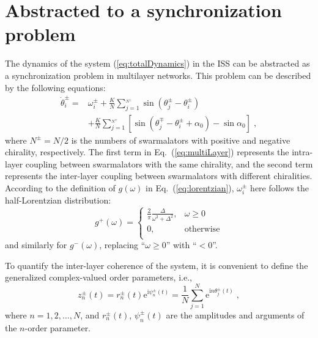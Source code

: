 \documentclass{article}
\begin{document}
\newpage
\section{Abstracted to a synchronization problem}

The dynamics of the system (\ref{eq:totalDynamics}) in the ISS can be abstracted as a synchronization problem in multilayer networks. This problem can be described by the following equations:
\begin{equation}
    \label{eq:multiLayer}
    \begin{aligned}
        \dot{\theta}_{i}^{\pm}=&\omega _{i}^{\pm}+\frac{K}{N}\sum_{j=1}^{_{N^{\pm}}}{\sin \left( \theta _{j}^{\pm}-\theta _{i}^{\pm} \right)}\\
        &+\frac{K}{N}\sum_{j=1}^{_{N^{\mp}}}{\left[ \sin \left( \theta _{j}^{\mp}-\theta _{i}^{\pm}+\alpha _0 \right) -\sin \alpha _0 \right]}\;,
    \end{aligned}
\end{equation}
where $N^{\pm}=N/2$ is the numbers of swarmalators with positive and negative chirality, respectively. The first term in Eq.~(\ref{eq:multiLayer}) represents the intra-layer coupling between swarmalators with the same chirality, and the second term represents the inter-layer coupling between swarmalators with different chiralities. According to the definition of $g\left(\omega\right)$ in Eq.~(\ref{eq:lorentzian}), $\omega^{\pm}_i$ here follows the half-Lorentzian distribution:
\begin{equation}
    g^{+}\left( \omega \right) =\begin{cases}
        \frac{2}{\pi}\frac{\Delta}{\omega ^2+\Delta ^2},&		\omega \geqslant 0\\
        0,&		\mathrm{otherwise}\\
    \end{cases}
\end{equation}
and similarly for $g^{-}\left( \omega \right)$, replacing \enquote{$\omega \geqslant 0$} with \enquote{$< 0$}.

To quantify the inter-layer coherence of the system, it is convenient to define the generalized complex-valued
order parameters, i.e.,
\begin{equation}
    \label{eq:orderParameter}
    z_{n}^{\pm}\left( t \right) =r_{n}^{\pm}\left( t \right) \text{e}^{\text{i}\psi _{n}^{\pm}\left( t \right)}=\frac{1}{N}\sum_{j=1}^N{\text{e}^{\text{i}n\theta _{j}^{\pm}\left( t \right)}}\;,
\end{equation}
where $n=1,2,\dots, N$, and $r_{n}^{\pm}\left( t \right)$, $\psi _{n}^{\pm}\left( t \right)$ are the amplitudes and arguments of the $n$-order parameter.
\end{document}
